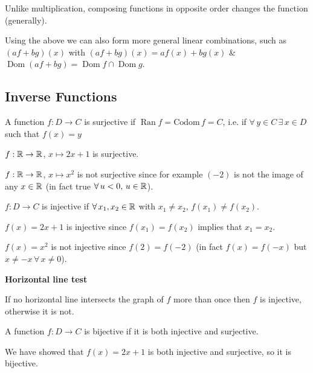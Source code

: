 \documentclass[10pt, a4paper]{article}
\DeclareMathOperator{\Dom}{Dom}
\DeclareMathOperator{\Ran}{Ran}
\begin{document}
Unlike multiplication, composing functions in opposite order changes the function (generally).

Using the above we can also form more general linear combinations, such as $(af + bg)(x)$ with $(af + bg)(x) = af(x) + bg(x)$ \& $\Dom (af + bg) = \Dom f \cap \Dom g$.

\subsection{Inverse Functions}
\begin{definition}
    A function $f : D \rightarrow C$ is surjective if $\Ran f = \mathrm{Codom}\, f = C$, i.e. if $\forall\, y \in C\, \exists\, x \in D$ such that $f(x) = y$
\end{definition}
\begin{example}
    $f : \mathbb{R} \rightarrow \mathbb{R}$, $x \mapsto 2x + 1$ is surjective.

    $f : \mathbb{R} \rightarrow \mathbb{R}$, $x \mapsto x ^ 2$ is not surjective since for example $(-2)$ is not the image of any $x \in \mathbb{R}$ (in fact true $\forall\,u < 0,\, u \in \mathbb{R}$).
\end{example}

\begin{definition}
    $f : D \rightarrow C$ is injective if $\forall\, x_1, x_2 \in \mathbb{R}$ with $x_1 \neq x_2,\, f(x_1) \neq f(x_2)$.
\end{definition}

\begin{example}
    $f(x) = 2x + 1$ is injective since $f(x_1) = f(x_2)$ implies that $x_1 = x_2$.

    $f(x) = x ^ 2$ is not injective since $f(2) = f(-2)$ (in fact $f(x) = f(-x)$ but $x \neq -x\, \forall\, x\neq 0$).
\end{example}

\textbf{Horizontal line test}

If no horizontal line intersects the graph of $f$ more than once then $f$ is injective, otherwise it is not.

\begin{definition}
    A function $f : D \rightarrow C$ is bijective if it is both injective and surjective.
\end{definition}

\begin{example}
    We have showed that $f(x) = 2x + 1$ is both injective and surjective, so it is bijective.
\end{example}
\end{document}
